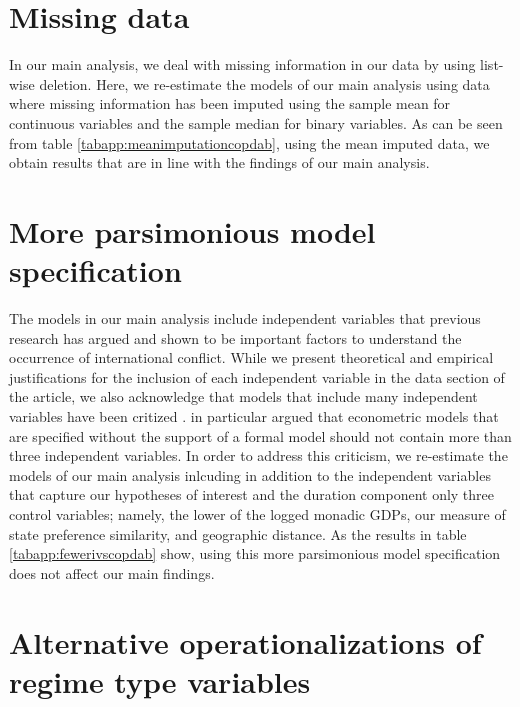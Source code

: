 \documentclass[12pt]{article}
\theoremstyle{hypothesis}
\begin{document}


\newpage

\section{Missing data}

In our main analysis, we deal with missing information in our data by using list-wise deletion. Here, we re-estimate the models of our main analysis using data where missing information has been imputed using the sample mean for continuous variables and the sample median for binary variables. As can be seen from table \ref{tabapp:meanimputationcopdab}, using the mean imputed data, we obtain results that are in line with the findings of our main analysis.



\newpage

\section{More parsimonious model specification}

The models in our main analysis include independent variables that previous research has argued and shown to be important factors to understand the occurrence of international conflict. While we present theoretical and empirical justifications for the inclusion of each independent variable in the data section of the article, we also acknowledge that models that include many independent variables have been critized \citep{Achen:2005}. \citet{Achen:2005} in particular argued that econometric models that are specified without the support of a formal model should not contain more than three independent variables. In order to address this criticism, we re-estimate the models of our main analysis inlcuding in addition to the independent variables that capture our hypotheses of interest and the duration component only three control variables; namely, the lower of the logged monadic GDPs, our measure of state preference similarity, and geographic distance. As the results in table \ref{tabapp:fewerivscopdab} show, using this more parsimonious model specification does not affect our main findings.



\newpage

\section{Alternative operationalizations of regime type variables}
\end{document}
